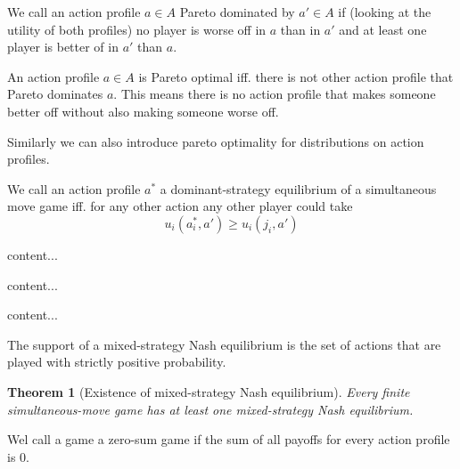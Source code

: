 \documentclass[12pt]{article}
\newtheorem{theorem}{Theorem}
\theoremstyle{definition}
\theoremstyle{remark}
\begin{document}
\begin{definition}
	We call an action profile $a\in A$ Pareto dominated by $a'\in A$ if (looking at the utility of both profiles) no player is worse off in $a$ than in $a'$ and at least one player is better of in $a'$ than $a$.
\end{definition}

\begin{definition}
	An action profile $a\in A$ is Pareto optimal iff. there is not other action profile that Pareto dominates $a$. This means there is no action profile that makes someone better off without also making someone worse off.
\end{definition}

Similarly we can also introduce pareto optimality for distributions on action profiles.

\begin{definition}
	We call an action profile $a^*$ a dominant-strategy equilibrium of a simultaneous move game iff. for any other action any other player could take 
	$$u_i(a^*_i,a') \geq u_i(j_i,a')$$
\end{definition}

\begin{definition}
	content...
\end{definition}

\begin{definition}
	content...
\end{definition}

\begin{definition}
	content... 
\end{definition}

\begin{definition}[Support]
The support of a mixed-strategy Nash equilibrium is the set of actions that are played with strictly positive probability.
\end{definition}


\begin{theorem}[Existence of mixed-strategy Nash equilibrium]
	Every finite simultaneous-move game has at least one mixed-strategy Nash equilibrium.
\end{theorem}



\begin{definition}
	Wel call a game a zero-sum game if the sum of all payoffs for every action profile is 0.
\end{definition}
\end{document}
